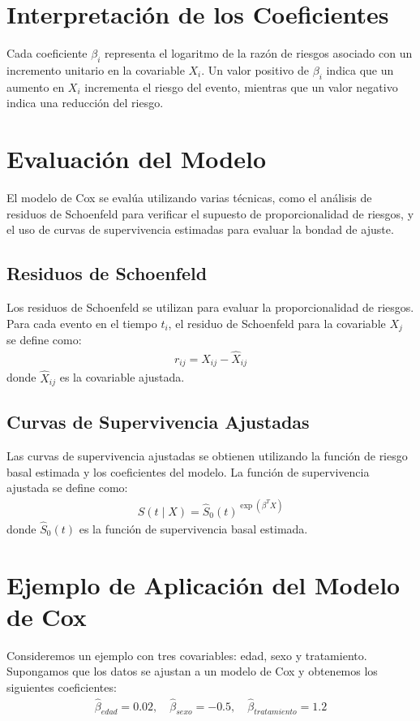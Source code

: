 \documentclass[a4paper]{report} %
\begin{document}
\section{Interpretaci\'on de los Coeficientes}
Cada coeficiente $\beta_i$ representa el logaritmo de la raz\'on de riesgos asociado con un incremento unitario en la covariable $X_i$. Un valor positivo de $\beta_i$ indica que un aumento en $X_i$ incrementa el riesgo del evento, mientras que un valor negativo indica una reducci\'on del riesgo.

\section{Evaluaci\'on del Modelo}
El modelo de Cox se eval\'ua utilizando varias t\'ecnicas, como el an\'alisis de residuos de Schoenfeld para verificar el supuesto de proporcionalidad de riesgos, y el uso de curvas de supervivencia estimadas para evaluar la bondad de ajuste.

\subsection{Residuos de Schoenfeld}
Los residuos de Schoenfeld se utilizan para evaluar la proporcionalidad de riesgos. Para cada evento en el tiempo $t_i$, el residuo de Schoenfeld para la covariable $X_j$ se define como:
\begin{eqnarray*}
r_{ij} = X_{ij} - \hat{X}_{ij}
\end{eqnarray*}
donde $\hat{X}_{ij}$ es la covariable ajustada.

\subsection{Curvas de Supervivencia Ajustadas}
Las curvas de supervivencia ajustadas se obtienen utilizando la funci\'on de riesgo basal estimada y los coeficientes del modelo. La funci\'on de supervivencia ajustada se define como:
\begin{eqnarray*}
\hat{S}(t \mid X) = \hat{S}_0(t)^{\exp(\beta^T X)}
\end{eqnarray*}
donde $\hat{S}_0(t)$ es la funci\'on de supervivencia basal estimada.

\section{Ejemplo de Aplicaci\'on del Modelo de Cox}
Consideremos un ejemplo con tres covariables: edad, sexo y tratamiento. Supongamos que los datos se ajustan a un modelo de Cox y obtenemos los siguientes coeficientes:
\begin{eqnarray*}
\hat{\beta}_{edad} = 0.02, \quad \hat{\beta}_{sexo} = -0.5, \quad \hat{\beta}_{tratamiento} = 1.2
\end{eqnarray*}
\end{document}
